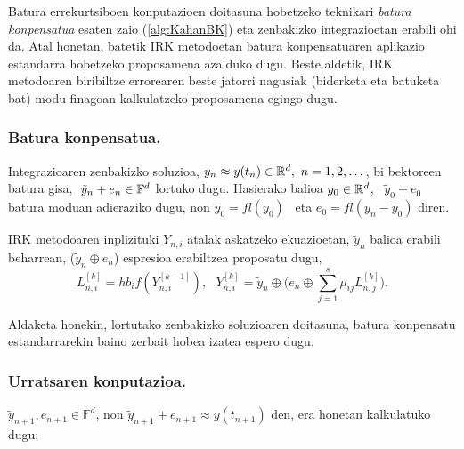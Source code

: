 Batura errekurtsiboen konputazioen doitasuna hobetzeko teknikari \emph{batura konpensatua} esaten zaio (\ref{alg:KahanBK}) eta zenbakizko integrazioetan erabili ohi da. Atal honetan, batetik IRK metodoetan batura konpensatuaren aplikazio estandarra hobetzeko proposamena azalduko dugu. Beste aldetik, IRK metodoaren biribiltze errorearen beste jatorri nagusiak (biderketa eta batuketa bat) modu finagoan kalkulatzeko proposamena egingo dugu.    


\subsubsection*{Batura konpensatua.}

Integrazioaren zenbakizko soluzioa, $y_n \approx y(t_n) \in \mathbb{R}^{d}, \ n=1,2,\dots$, bi bektoreen batura gisa, $ \ \tilde{y}_n+e_n \in \mathbb{F}^{d}$ lortuko dugu. Hasierako balioa $y_0 \in \mathbb{R}^{d}$, \ $\tilde{y}_0+e_0$ batura moduan adieraziko dugu, non $\tilde{y}_0=fl(y_0)$~ eta $e_0=fl(y_n-\tilde{y}_0)$ diren. 

IRK metodoaren inplizituki $Y_{n,i}$ atalak askatzeko ekuazioetan, $\tilde {y}_n$ balioa erabili beharrean, ($\tilde{y}_n \oplus e_{n}$) espresioa erabiltzea proposatu dugu, 
\begin{equation}
\label{eq:eqbk}
L_{n,i}^{[k]}=hb_if(Y_{n,i}^{[k-1]}), \ \ \ Y_{n,i}^{[k]}=\tilde{y}_n \oplus \big(e_{n} \oplus \sum\limits_{j=1}^{s} \mu_{ij} L_{n,j}^{[k]}\big).
\end{equation}

Aldaketa honekin, lortutako zenbakizko soluzioaren doitasuna, batura konpensatu estandarrarekin baino zerbait hobea izatea espero dugu. 

\subsubsection*{Urratsaren konputazioa.}

$\tilde{y}_{n+1}, e_{n+1} \in \mathbb{F}^d$, non $\tilde{y}_{n+1}+e_{n+1}\approx y(t_{n+1})$ den, era honetan kalkulatuko dugu:

